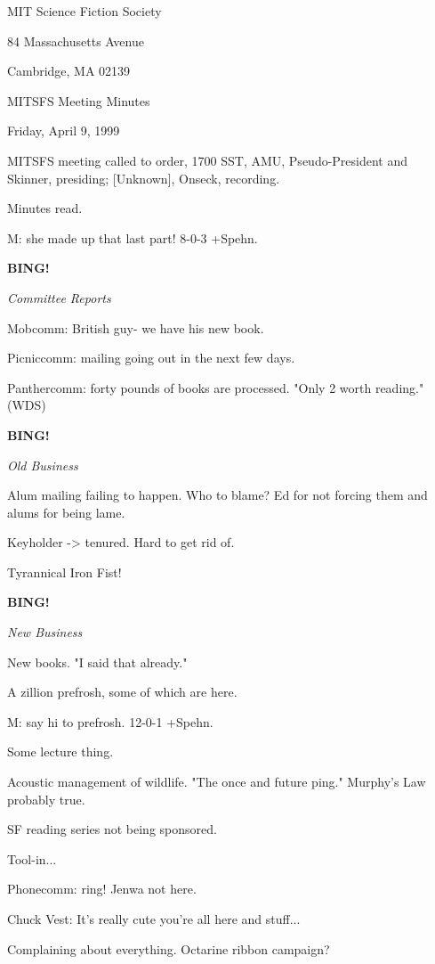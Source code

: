 \documentclass[12pt]{article}
\newcommand{\bing}{{\bf BING!} }
\newcommand{\goto}[1]{\bing \vskip 12pt \centerline{{\em{#1}}}}
\begin{document}
\begin{center}

MIT Science Fiction Society 

84 Massachusetts Avenue

Cambridge, MA 02139

\vspace{12pt}

MITSFS Meeting Minutes 

Friday, April 9, 1999

\end{center}
 
\vspace{18pt}

\setlength{\parskip}{6pt}

\noindent
MITSFS meeting called to order, 1700 SST,
AMU, Pseudo-President and Skinner, presiding; [Unknown], Onseck, recording.

Minutes read.

M: she made up that last part! 8-0-3 +Spehn.

\goto{Committee Reports}

Mobcomm: British guy- we have his new book.

Picniccomm: mailing going out in the next few days.

Panthercomm: forty pounds of books are processed. "Only 2 worth reading." (WDS)

\goto{Old Business}

Alum mailing failing to happen. Who to blame? Ed for not forcing them and alums for being lame.

Keyholder -> tenured. Hard to get rid of.

Tyrannical Iron Fist!

\goto{New Business}

New books. "I said that already."

A zillion prefrosh, some of which are here.

M: say hi to prefrosh. 12-0-1 +Spehn.

Some lecture thing.

Acoustic management of wildlife. "The once and future ping." Murphy's Law probably true.

SF reading series not being sponsored.

Tool-in...

Phonecomm: ring! Jenwa not here.

Chuck Vest: It's really cute you're all here and stuff...

Complaining about everything. Octarine ribbon campaign?
\end{document}
